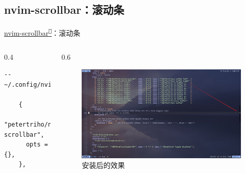 \documentclass[aspectratio=169]{ctexbeamer}
\newcommand{\nerd}[1]{\texttt{#1}}
\newcommand{\link}[3][]{\href{#3}{#2\textsuperscript{\nerd{}}}}
\begin{document}
\subsection{nvim-scrollbar：滚动条}
\begin{frame}[fragile]{\link{nvim-scrollbar}{https://github.com/petertriho/nvim-scrollbar}：滚动条}
  \begin{columns}
    \begin{column}{0.4\linewidth}
        \begin{lstlisting}[basicstyle=\tiny\ttfamily]
    -- ~/.config/nvim/lua/plugins/ui.lua

    {
      "petertriho/nvim-scrollbar",
      opts = {},
    },
        \end{lstlisting}
    \end{column}

    \begin{column}{0.6\linewidth}
      \begin{figure}[H]
        \centering
        \includegraphics[width=\linewidth]{./Figures/Scrollbar_Finish.jpg}
        \caption{安装后的效果}%
      \end{figure}
    \end{column}
  \end{columns}
\end{frame}
\end{document}
